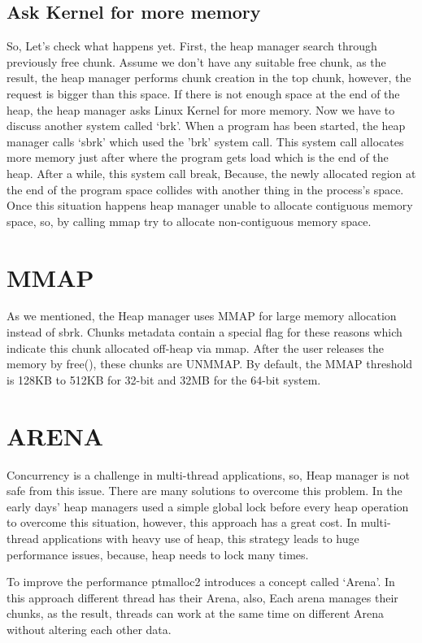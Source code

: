\documentclass{masterthesis}
\begin{document}
\subsection{Ask Kernel for more memory}
So, Let's check what happens yet. First, the heap manager search through previously free chunk. Assume we don't have any suitable free chunk, as the result, the heap manager performs chunk creation in the top chunk, however, the request is bigger than this space. If there is not enough space at the end of the heap, the heap manager asks Linux Kernel for more memory. Now we have to discuss another system called ‘brk’. When a program has been started, the heap manager calls ‘sbrk’ which used the 'brk' system call. This system call allocates more memory just after where the program gets load which is the end of the heap. 
After a while, this system call break, Because, the newly allocated region at the end of the program space collides with another thing in the process’s space. Once this situation happens heap manager unable to allocate contiguous memory space, so, by calling mmap try to allocate non-contiguous memory space. 

\section{MMAP}
As we mentioned, the Heap manager uses MMAP for large memory allocation instead of sbrk. Chunks metadata contain a special flag for these reasons which indicate this chunk allocated off-heap via mmap. After the user releases the memory by free(), these chunks are UNMMAP. By default, the MMAP threshold is 128KB to 512KB for 32-bit and 32MB for the 64-bit system.

\section{ARENA}
Concurrency is a challenge in multi-thread applications, so, Heap manager is not safe from this issue. There are many solutions to overcome this problem. In the early days' heap managers used a simple global lock before every heap operation to overcome this situation, however, this approach has a great cost. In multi-thread applications with heavy use of heap, this strategy leads to huge performance issues, because, heap needs to lock many times.

To improve the performance ptmalloc2 introduces a concept called ‘Arena’. In this approach different thread has their Arena, also, Each arena manages their chunks, as the result, threads can work at the same time on different Arena without altering each other data.
\end{document}
